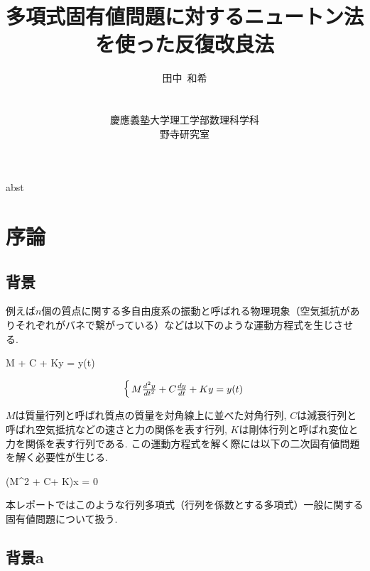 \documentclass[a4paper,12pt]{nodlabpabw}
\newenvironment{Eqnarray*}%
{\arraycolsep 0.14em\begin{eqnarray*}}{\end{eqnarray*}}
\begin{document}
\title{多項式固有値問題に対するニュートン法を使った反復改良法}
\author{田中\ 和希\\\\\\慶應義塾大学理工学部数理科学科\\野寺研究室}
\date{}
\maketitle
\begin{tableofcontents}
\end{tableofcontents}
\abstract
abst
\endabstract
%
\chapter{序論}
\section{背景}\label{chapint}
例えば$n$個の質点に関する多自由度系の振動と呼ばれる物理現象（空気抵抗がありそれぞれがバネで繋がっている）などは以下のような運動方程式を生じさせる.

\begin{Eqnarray*}
M + C + Ky = y(t)
\end{Eqnarray*}


\begin{equation}\left\{\arraycolsep 0.14em\begin{array}{rcll}
M\frac{d^2y}{dt^2} + C\frac{dy}{dt} + Ky = y(t)
\end{array}\right.\label{11}\end{equation}


$M$は質量行列と呼ばれ質点の質量を対角線上に並べた対角行列, $C$は減衰行列と呼ばれ空気抵抗などの速さと力の関係を表す行列, $K$は剛体行列と呼ばれ変位と力を関係を表す行列である. この運動方程式を解く際には以下の二次固有値問題を解く必要性が生じる.

\begin{Eqnarray*}
(M\lambda^2 + C\lambda + K)x = 0
\end{Eqnarray*}

本レポートではこのような行列多項式（行列を係数とする多項式）一般に関する固有値問題について扱う.

\section{背景a}\label{chapint}
\end{document}
